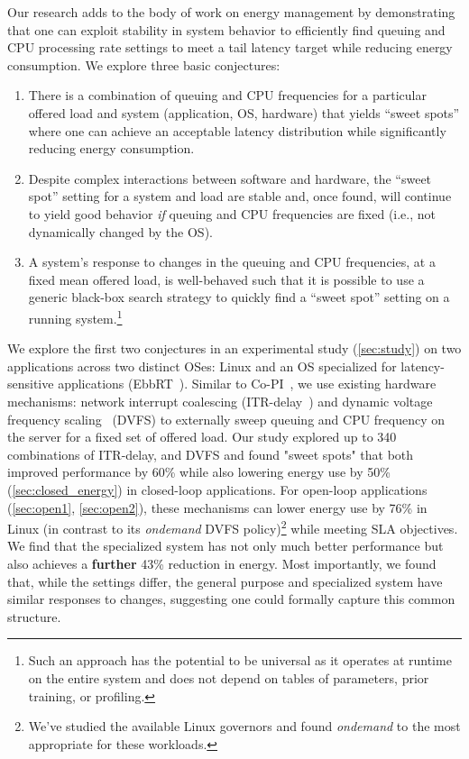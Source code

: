 Our research adds to the body of work on energy management\cite{slowdownorsleep,dreamweaver,dynsleep,pacingtoidle} by demonstrating that one can exploit stability in system behavior to efficiently find queuing and CPU processing rate settings to meet a tail latency target while reducing energy consumption.
We explore three basic conjectures:
\begin{enumerate}

\item There is a combination of queuing and CPU frequencies for a
  particular offered load and system (application, OS, hardware) that yields ``sweet spots'' where one can
  achieve an acceptable latency distribution while significantly reducing energy
  consumption.

\item Despite complex interactions between software and hardware, the ``sweet spot'' setting for
  a system and load are stable and, once found, will continue to yield good behavior \textit{if} queuing and CPU frequencies are fixed (i.e., not dynamically changed by the OS).

\item A system's response to changes in the queuing and CPU frequencies, at a fixed mean offered load, is well-behaved such that
  it is possible to use a generic black-box search strategy to quickly find a ``sweet spot'' setting on a running system.\footnote{Such an approach has the potential to be
  universal as it operates at runtime on the entire system and does not depend on tables of parameters, prior training, or profiling.}

\end{enumerate}


We explore the first two conjectures in an experimental study (\cref{sec:study}) on two applications across two distinct OSes: Linux and an OS specialized for latency-sensitive applications (EbbRT~\cite{ebbrt}). Similar to Co-PI~\cite{9248059}, we use existing hardware mechanisms: network interrupt coalescing (ITR-delay~\cite{intelinterruptmoderation}) and dynamic voltage frequency scaling~\cite{cpufreq_governor} (DVFS) to externally sweep queuing and CPU frequency on the server for a fixed set of offered load. Our study explored up to 340 combinations of ITR-delay, and DVFS and found "sweet spots" that both improved performance by 60\% while also lowering energy use by 50\% (\cref{sec:closed_energy}) in closed-loop applications. For open-loop applications (\cref{sec:open1}, \cref{sec:open2}), these mechanisms can lower energy use by 76\% in Linux (in contrast to its \textit{ondemand} DVFS policy)\footnote{We've studied the available Linux governors and found \textit{ondemand} to the most appropriate for these workloads.}  while meeting SLA objectives. 
We find that the specialized system has not only much better performance but also achieves a \textbf{further} 43\% reduction in energy. 
Most importantly, we found that, while the settings differ, the general purpose and specialized system have similar responses to changes, suggesting one could formally capture this common structure.

